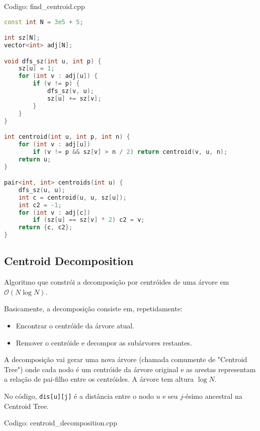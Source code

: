 \documentclass[10pt, a4paper, oneside]{book}
\begin{document}
Codigo: find\_centroid.cpp

\begin{lstlisting}[language=C++]
const int N = 3e5 + 5;

int sz[N];
vector<int> adj[N];

void dfs_sz(int u, int p) {
    sz[u] = 1;
    for (int v : adj[u]) {
        if (v != p) {
            dfs_sz(v, u);
            sz[u] += sz[v];
        }
    }
}

int centroid(int u, int p, int n) {
    for (int v : adj[u])
        if (v != p && sz[v] > n / 2) return centroid(v, u, n);
    return u;
}

pair<int, int> centroids(int u) {
    dfs_sz(u, u);
    int c = centroid(u, u, sz[u]);
    int c2 = -1;
    for (int v : adj[c])
        if (sz[u] == sz[v] * 2) c2 = v;
    return {c, c2};
}\end{lstlisting}
\hfill

\subsection{Centroid Decomposition}


Algoritmo que constrói a decomposição por centróides de uma árvore em $\mathcal{O}(N \log N)$.



Basicamente, a decomposição consiste em, repetidamente:



\begin{itemize}
\item Encontrar o centróide da árvore atual.
\item Remover o centróide e decompor as subárvores restantes.
\end{itemize}



A decomposição vai gerar uma nova árvore (chamada comumente de "Centroid Tree") onde cada nodo é um centróide da árvore original e as arestas representam a relação de pai-filho entre os centróides. A árvore tem altura $\log N$.



No código, \texttt{dis[u][j]} é a distância entre o nodo $u$ e seu $j$-ésimo ancestral na Centroid Tree.

\hfill

Codigo: centroid\_decomposition.cpp
\end{document}
